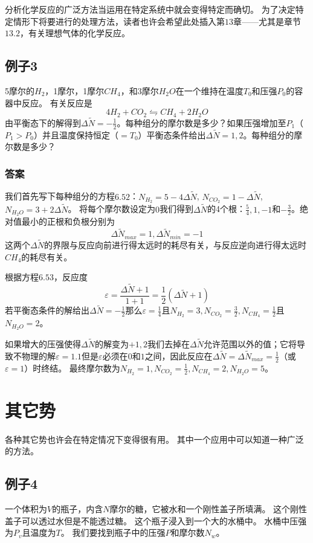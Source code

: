 分析化学反应的广泛方法当运用在特定系统中就会变得特定而确切。
为了决定特定情形下将要进行的处理方法，读者也许会希望此处插入第$13$章——尤其是章节$13.2$，有关理想气体的化学反应。

\subsection*{例子3}
5摩尔的$H_2$，1摩尔，1摩尔$CH_4$，和3摩尔$H_2O$在一个维持在温度$T_0$和压强$P_0$的容器中反应。
有关反应是
\[ 4H_2+CO_2\leftrightharpoons CH_4+2H_2O \]
由平衡态下的解得到$\Delta \tilde{N}=-\frac{1}{2}$。每种组分的摩尔数是多少？如果压强增加至$P_1$（$P_1>P_0$）并且温度保持恒定（$=T_0$）平衡态条件给出$\Delta \tilde{N}=1, 2$。每种组分的摩尔数是多少？
\subsubsection*{答案}
我们首先写下每种组分的方程$6.52$：$N_{H_2}=5-4\Delta \tilde{N}$, $N_{CO_2}=1-\Delta \tilde{N}$, $N_{H_2O}=3+2\Delta \tilde{N}$。
将每个摩尔数设定为$0$我们得到$\Delta \tilde{N}$的4个根：$\frac{5}{4}, 1, -1$和$-\frac{3}{2}$。绝对值最小的正根和负根分别为
\[ \Delta \tilde{N}_{max}=1, \Delta \tilde{N}_{min}=-1 \]
这两个$\Delta \tilde{N}$的界限与反应向前进行得太远时的耗尽有关，与反应逆向进行得太远时$CH_4$的耗尽有关。

根据方程$6.53$，反应度
\[ \varepsilon=\frac{\Delta \tilde{N}+1}{1+1}=\frac{1}{2}(\Delta \tilde{N}+1) \]
若平衡态条件的解给出$\Delta \tilde{N}=-\frac{1}{2}$那么$\varepsilon=\frac{1}{4}$且$N_{H_2}=3, N_{CO_2}=\frac{3}{2}, N_{CH_4}=\frac{1}{2}$且$N_{H_2O}=2$。

如果增大的压强使得$\Delta \tilde{N}$的解变为$+1, 2$我们去掉在$\Delta \tilde{N}$允许范围以外的值；它将导致不物理的解$\varepsilon=1.1$但是$\varepsilon$必须在$0$和$1$之间，因此反应在$\Delta \tilde{N}=\Delta \tilde{N}_{max}=\frac{1}{2}$（或$\varepsilon=1$）时终结。
最终摩尔数为$N_{H_2}=1, N_{CO_2}=\frac{1}{2}, N_{CH_4}=2, N_{H_2O}=5$。


\section{其它势}
\label{sec6.5}

各种其它势也许会在特定情况下变得很有用。
其中一个应用中可以知道一种广泛的方法。

\subsection*{例子4}
一个体积为$V$的瓶子，内含$N$摩尔的糖，它被水和一个刚性盖子所填满。
这个刚性盖子可以透过水但是不能透过糖。
这个瓶子浸入到一个大的水桶中。
水桶中压强为$P_v$且温度为$T$。
我们要找到瓶子中的压强$P$和摩尔数$N_w$。
